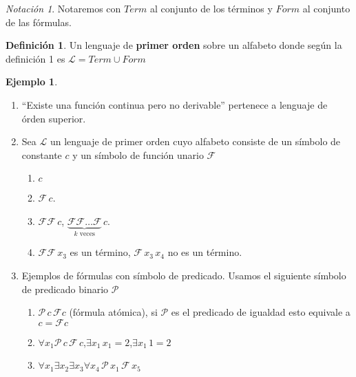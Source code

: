 \documentclass[a4paper,11pt]{article}
\theoremstyle{definition}
\newtheorem{defn}{Definición}[section]
\newtheorem{exap}{Ejemplo}[section]
\theoremstyle{remark}
\newtheorem*{notc}{Notación}
\begin{document}
\begin{notc}
    Notaremos con $Term$ al conjunto de los términos y $Form$ al conjunto de las fórmulas.
\end{notc}

\begin{defn}
    Un lenguaje de \textbf{primer orden} sobre un alfabeto donde según la definición 1 es
    $\mathcal L = Term \cup Form$
\end{defn}

\begin{exap}
    \begin{enumerate}
        \item ``Existe una función continua pero no derivable'' pertenece a lenguaje de órden superior.
        
        \item Sea $\mathcal L$ un lenguaje de primer orden cuyo alfabeto consiste de 
        un símbolo de constante $c$ y un símbolo de función unario $\mathcal F$
        
        \begin{enumerate}
            \item $c$
            \item $\mathcal F\,c$.
            \item $\mathcal F\mathcal F\,c$, $\underbrace{\mathcal F\mathcal F\dots \mathcal F}_{k \text{ veces}}\,c$.
            \item $\mathcal F\mathcal F\,x_3$ es un término, $\mathcal F\,x_3\,x_4$ no es un término.
        \end{enumerate}
        
        \item Ejemplos de fórmulas con símbolo de predicado. Usamos el siguiente símbolo 
        de predicado binario $\mathcal P$
        
        \begin{enumerate}
            \item $\mathcal P\,c\,\mathcal Fc$ (fórmula atómica), si $\mathcal P$ es el 
            predicado de igualdad esto equivale a $c = \mathcal F c$
            
            \item $\forall x_1 \mathcal P\,c\,\mathcal F\,c$,\quad $\exists x_1\,x_1 = 2$,\quad $\exists x_1\,1 = 2$
            
            \item $\forall x_1 \exists x_2 \exists x_3 \forall x_4\,\mathcal P\,x_1\,\mathcal F\,x_5$
        \end{enumerate}
    \end{enumerate}
\end{exap}
\end{document}
